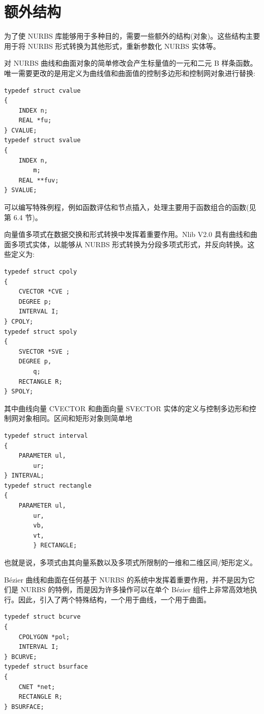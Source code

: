 \documentclass[../main.tex]{subfiles}
\begin{document}
\section{额外结构}

为了使 NURBS 库能够用于多种目的，需要一些额外的结构(对象)。这些结构主要用于将 NURBS 形式转换为其他形式，重新参数化 NURBS 实体等。

对 NURBS 曲线和曲面对象的简单修改会产生标量值的一元和二元 B 样条函数。唯一需要更改的是用定义为曲线值和曲面值的控制多边形和控制网对象进行替换:

\begin{verbatim}
typedef struct cvalue
{
    INDEX n;
    REAL *fu;
} CVALUE;
typedef struct svalue
{
    INDEX n,
        m;
    REAL **fuv;
} SVALUE;
\end{verbatim}

可以编写特殊例程，例如函数评估和节点插入，处理主要用于函数组合的函数(见第 6.4 节)。

向量值多项式在数据交换和形式转换中发挥着重要作用。Nlib V2.0 具有曲线和曲面多项式实体，以能够从 NURBS 形式转换为分段多项式形式，并反向转换。这些定义为:

\begin{verbatim}
typedef struct cpoly
{
    CVECTOR *CVE ;
    DEGREE p;
    INTERVAL I;
} CPOLY;
typedef struct spoly
{
    SVECTOR *SVE ;
    DEGREE p,
        q;
    RECTANGLE R;
} SPOLY;
\end{verbatim}

其中曲线向量 CVECTOR 和曲面向量 SVECTOR 实体的定义与控制多边形和控制网对象相同。区间和矩形对象则简单地

\begin{verbatim}
typedef struct interval
{
    PARAMETER ul,
        ur;
} INTERVAL;
typedef struct rectangle
{
    PARAMETER ul,
        ur,
        vb,
        vt,
        } RECTANGLE;
\end{verbatim}

也就是说，多项式由其向量系数以及多项式所限制的一维和二维区间/矩形定义。

Bézier 曲线和曲面在任何基于 NURBS 的系统中发挥着重要作用，并不是因为它们是 NURBS 的特例，而是因为许多操作可以在单个 Bézier 组件上非常高效地执行。因此，引入了两个特殊结构，一个用于曲线，一个用于曲面。

\begin{verbatim}
typedef struct bcurve
{
    CPOLYGON *pol;
    INTERVAL I;
} BCURVE;
typedef struct bsurface
{
    CNET *net;
    RECTANGLE R;
} BSURFACE;
\end{verbatim}
\end{document}
